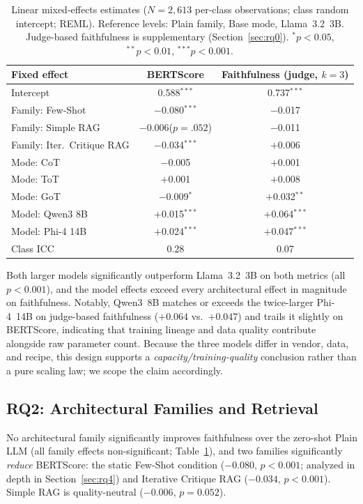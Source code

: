 \documentclass[pdflatex,sn-mathphys-ay]{sn-jnl}%
\theoremstyle{thmstyleone}%
\theoremstyle{thmstyletwo}%
\theoremstyle{thmstylethree}%
\begin{document}
{\begin{table}[h]
\centering
\small
\caption{Linear mixed-effects estimates ($N{=}2{,}613$ per-class observations; class random intercept; REML). Reference levels: Plain family, Base mode, Llama~3.2~3B. Judge-based faithfulness is supplementary (Section~\ref{sec:rq0}). $^{*}p{<}0.05$, $^{**}p{<}0.01$, $^{***}p{<}0.001$.}
\label{tab:mixedeffects}
\begin{tabular}{lcc}
\toprule
\textbf{Fixed effect} & \textbf{BERTScore} & \textbf{Faithfulness (judge, $k{=}3$)} \\
\midrule
Intercept                    & 0.588$^{***}$          & 0.737$^{***}$ \\
Family: Few-Shot             & $-$0.080$^{***}$       & $-$0.017 \\
Family: Simple RAG           & $-$0.006\;($p{=}.052$) & $-$0.011 \\
Family: Iter.\ Critique RAG  & $-$0.034$^{***}$       & $+$0.006 \\
Mode: CoT                    & $-$0.005               & $+$0.001 \\
Mode: ToT                    & $+$0.001               & $+$0.008 \\
Mode: GoT                    & $-$0.009$^{*}$         & $+$0.032$^{**}$ \\
Model: Qwen3 8B              & $+$0.015$^{***}$       & $+$0.064$^{***}$ \\
Model: Phi-4 14B             & $+$0.024$^{***}$       & $+$0.047$^{***}$ \\
\midrule
Class ICC                    & 0.28                   & 0.07 \\
\bottomrule
\end{tabular}
\end{table}

Both larger models significantly outperform Llama~3.2~3B on both metrics (all $p<0.001$), and the model effects exceed every architectural effect in magnitude on faithfulness. Notably, Qwen3~8B matches or exceeds the twice-larger Phi-4~14B on judge-based faithfulness ($+0.064$ vs.\ $+0.047$) and trails it slightly on BERTScore, indicating that training lineage and data quality contribute alongside raw parameter count. Because the three models differ in vendor, data, and recipe, this design supports a \emph{capacity/training-quality} conclusion rather than a pure scaling law; we scope the claim accordingly.

\subsection{RQ2: Architectural Families and Retrieval}
\label{sec:rq2}
No architectural family significantly improves faithfulness over the zero-shot Plain LLM (all family effects non-significant; Table~\ref{tab:mixedeffects}), and two families significantly \emph{reduce} BERTScore: the static Few-Shot condition ($-0.080$, $p<0.001$; analyzed in depth in Section~\ref{sec:rq4}) and Iterative Critique RAG ($-0.034$, $p<0.001$). Simple RAG is quality-neutral ($-0.006$, $p=0.052$).

}
\end{document}
